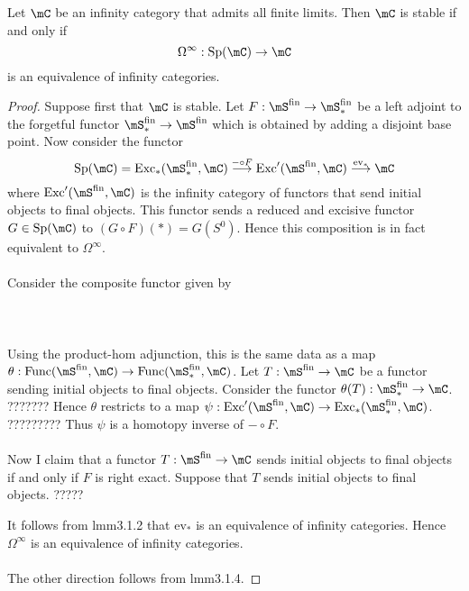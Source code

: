 \documentclass[a4paper]{article}
\begin{document}
\begin{prp}{}{} Let $\mC$ be an infinity category that admits all finite limits. Then $\mC$ is stable if and only if $$\Omega^\infty:\text{Sp}(\mC)\to\mC$$ is an equivalence of infinity categories. \tcbline
\begin{proof}
Suppose first that $\mC$ is stable. Let $F:\mS^\text{fin}\to\mS_\ast^\text{fin}$ be a left adjoint to the forgetful functor $\mS_\ast^\text{fin}\to\mS^\text{fin}$ which is obtained by adding a disjoint base point. Now consider the functor $$\text{Sp}(\mC)=\text{Exc}_\ast(\mS_\ast^\text{fin},\mC)\overset{-\circ F}{\longrightarrow}\text{Exc}'(\mS^\text{fin},\mC)\overset{\text{ev}_{\ast}}{\longrightarrow}\mC$$ where $\text{Exc}'(\mS^\text{fin},\mC)$ is the infinity category of functors that send initial objects to final objects. This functor sends a reduced and excisive functor $G\in\text{Sp}(\mC)$ to $(G\circ F)(\ast)=G(S^0)$. Hence this composition is in fact equivalent to $\Omega^\infty$. \\~\\

Consider the composite functor given by \\~\\
\\~\\
Using the product-hom adjunction, this is the same data as a map $\theta:\text{Func}(\mS^\text{fin},\mC)\to\text{Func}(\mS_\ast^\text{fin},\mC)$. Let $T:\mS^\text{fin}\to\mC$ be a functor sending initial objects to final objects. Consider the functor $\theta(T):\mS_\ast^\text{fin}\to\mC$. ??????? Hence $\theta$ restricts to a map $\psi:\text{Exc}'(\mS^\text{fin},\mC)\to\text{Exc}_\ast(\mS_\ast^\text{fin},\mC)$. ????????? Thus $\psi$ is a homotopy inverse of $-\circ F$. \\~\\

Now I claim that a functor $T:\mS^\text{fin}\to\mC$ sends initial objects to final objects if and only if $F$ is right exact. Suppose that $T$ sends initial objects to final objects. ????? 

It follows from lmm3.1.2 that $\text{ev}_\ast$ is an equivalence of infinity categories. Hence $\Omega^\infty$ is an equivalence of infinity categories. \\~\\

The other direction follows from lmm3.1.4. 
\end{proof}
\end{prp}
\end{document}
